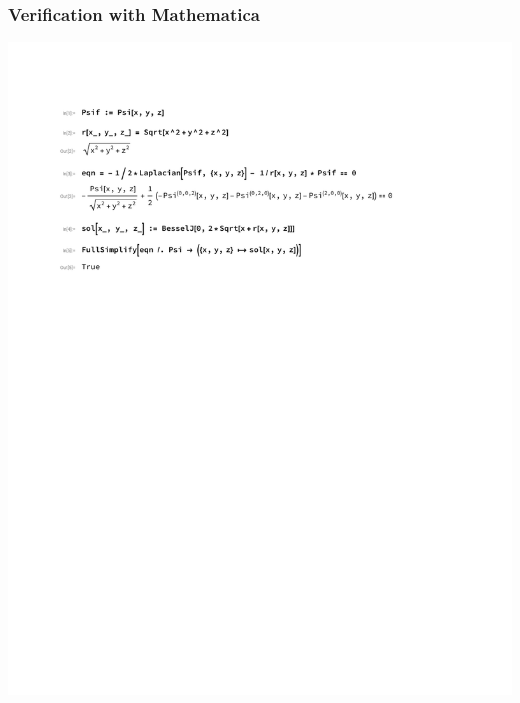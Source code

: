 \documentclass{beamer}
\begin{document}
\begin{frame}
\frametitle{Verification with Mathematica}
\includegraphics[page=1, clip, trim=1in 7in 1in 1in, width=\textwidth]{improved.pdf}
\end{frame}


\end{document}
